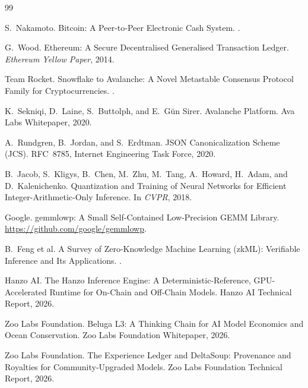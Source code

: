 \begin{thebibliography}{99}
\small

S.~Nakamoto.
\newblock Bitcoin: A Peer-to-Peer Electronic Cash System.
.

G.~Wood.
\newblock Ethereum: A Secure Decentralised Generalised Transaction Ledger.
\newblock \emph{Ethereum Yellow Paper}, 2014.

Team Rocket.
\newblock Snowflake to Avalanche: A Novel Metastable Consensus Protocol Family for Cryptocurrencies.
.

K.~Sekniqi, D.~Laine, S.~Buttolph, and E.~G\"un Sirer.
\newblock Avalanche Platform.
\newblock Ava Labs Whitepaper, 2020.

A.~Rundgren, B.~Jordan, and S.~Erdtman.
\newblock JSON Canonicalization Scheme (JCS).
\newblock RFC~8785, Internet Engineering Task Force, 2020.

B.~Jacob, S.~Kligys, B.~Chen, M.~Zhu, M.~Tang, A.~Howard, H.~Adam, and D.~Kalenichenko.
\newblock Quantization and Training of Neural Networks for Efficient Integer-Arithmetic-Only Inference.
\newblock In \emph{CVPR}, 2018.

Google.
\newblock gemmlowp: A Small Self-Contained Low-Precision GEMM Library.
\newblock \url{https://github.com/google/gemmlowp}.

B.~Feng et al.
\newblock A Survey of Zero-Knowledge Machine Learning (zkML): Verifiable Inference and Its Applications.
.

Hanzo AI.
\newblock The Hanzo Inference Engine: A Deterministic-Reference, GPU-Accelerated Runtime for On-Chain and Off-Chain Models.
\newblock Hanzo AI Technical Report, 2026.

Zoo Labs Foundation.
\newblock Beluga L3: A Thinking Chain for AI Model Economics and Ocean Conservation.
\newblock Zoo Labs Foundation Whitepaper, 2026.

Zoo Labs Foundation.
\newblock The Experience Ledger and DeltaSoup: Provenance and Royalties for Community-Upgraded Models.
\newblock Zoo Labs Foundation Technical Report, 2026.

\end{thebibliography}

